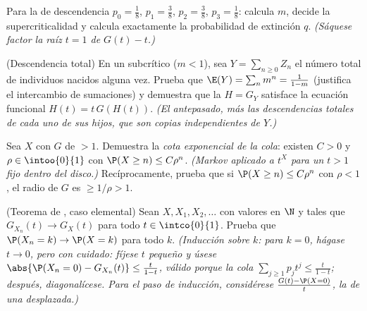 \begin{exercise}[$\star\star$]\label{exo:b2:genfun:6}
Para la  de descendencia $p_0 = \frac18$, $p_1 = \frac38$, $p_2 =
\frac38$, $p_3 = \frac18$: calcula $m$, decide la supercriticalidad y
calcula exactamente la probabilidad de extinción $q$. \emph{(Sáquese
factor la raíz $t = 1$ de $G(t) - t$.)}
\end{exercise}

\begin{exercise}[$\star\star\star$]\label{exo:b2:genfun:7}
(Descendencia total) En un  subcrítico ($m <
1$), sea $Y = \sum_{n\geq0} Z_n$ el número total de individuos
nacidos alguna vez. Prueba que $\E(Y) = \sum_n m^n = \frac{1}{1 - m}$
(justifica el intercambio de sumaciones) y demuestra que la
 $H = G_Y$ satisface la ecuación funcional $H(t) =
t\,G(H(t))$. \emph{(El antepasado, más las descendencias totales de
cada uno de sus hijos, que son copias independientes de $Y$.)}
\end{exercise}

\begin{exercise}[$\star\star\star$]\label{exo:b2:genfun:8}
Sea $X$ con  $G$ de  $> 1$.
Demuestra la \emph{cota exponencial de la cola}: existen $C > 0$ y
$\rho \in \intoo{0}{1}$ con $\P(X \geq n) \leq C\rho^n$. \emph{(Markov
aplicado a $t^X$ para un $t > 1$ fijo dentro del disco.)}
Recíprocamente, prueba que si $\P(X \geq n) \leq C\rho^n$ con $\rho <
1$, el radio de $G$ es $\geq 1/\rho > 1$.
\end{exercise}

\begin{exercise}[$\star\star\star$]\label{exo:b2:genfun:9}
(Teorema de , caso elemental) Sean $X, X_1, X_2, \dots$ con
valores en $\N$ y tales que $G_{X_n}(t) \to G_X(t)$ para todo $t \in
\intco{0}{1}$. Prueba que $\P(X_n = k) \to \P(X = k)$ para todo $k$.
\emph{(Inducción sobre $k$: para $k = 0$, hágase $t \to 0$, pero con
cuidado: fíjese $t$ pequeño y úsese $\abs{\P(X_n = 0) - G_{X_n}(t)}
\leq \frac{t}{1-t}$, válido porque la cola $\sum_{j \geq 1}p_jt^j \leq
\frac{t}{1 - t}$; después, diagonalícese. Para el paso de inducción,
considérese $\frac{G(t) - \P(X = 0)}{t}$, la  de
una  desplazada.)}
\end{exercise}

